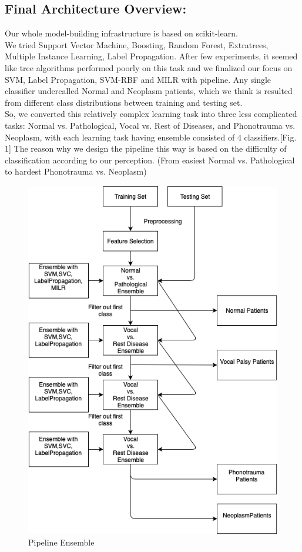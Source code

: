 \subsection{Final Architecture Overview:}
	Our whole model-building infrastructure is based on scikit-learn\cite{b7}\cite{b8}. \\
	\indent We tried Support Vector Machine, Boosting, Random Forest, Extratrees, Multiple Instance Learning, Label Propagation. After few experiments, it seemed like tree algorithms performed poorly on this task and we finalized our focus on SVM, Label Propagation, SVM-RBF and MILR with pipeline. Any single  classifier undercalled Normal and Neoplasm patients, which we think is resulted from different class distributions between training and testing set. \\
\indent So, we converted this relatively complex learning task into three less complicated tasks: Normal vs. Pathological, Vocal vs. Rest of Diseases, and Phonotrauma vs. Neoplasm, with each learning task having ensemble consisted of 4 classifiers.[Fig. 1] The reason why we design the pipeline this way is based on the difficulty of classification according to our perception. (From easiest Normal vs. Pathological to hardest Phonotrauma vs. Neoplasm)
	\begin{figure}[htbp]
		\begin{center}
			\includegraphics[scale=0.35]{Diagram_1.png}
		\end{center}
		\caption{Pipeline Ensemble}
	\end{figure}

